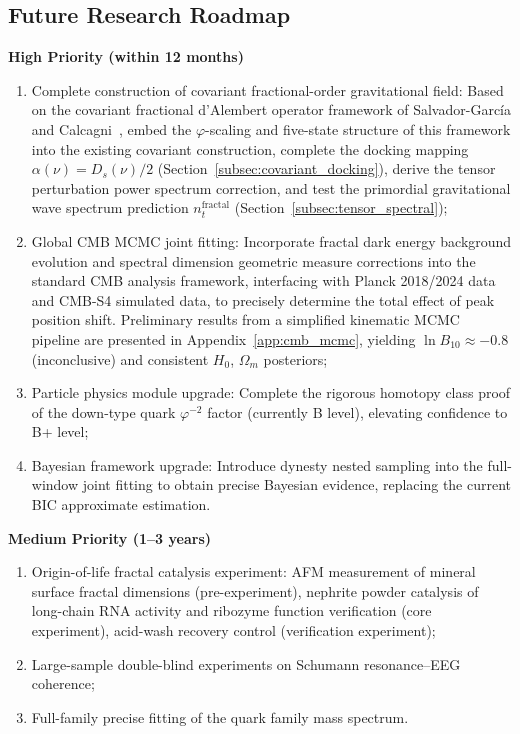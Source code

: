 \documentclass[12pt,a4paper,twocolumn]{article}
\renewcommand{\phi}{\varphi}
\begin{document}
\subsection{Future Research Roadmap}
\textbf{High Priority (within 12 months)}
\begin{enumerate}
\item Complete construction of covariant fractional-order gravitational field: Based on the covariant fractional d'Alembert operator framework of Salvador-Garc\'ia and Calcagni~\cite{SalvadorGarcia2026}, embed the $\phi$-scaling and five-state structure of this framework into the existing covariant construction, complete the docking mapping $\alpha(\nu) = D_s(\nu)/2$ (Section~\ref{subsec:covariant_docking}), derive the tensor perturbation power spectrum correction, and test the primordial gravitational wave spectrum prediction $n_t^{\text{fractal}}$ (Section~\ref{subsec:tensor_spectral});
\item Global CMB MCMC joint fitting: Incorporate fractal dark energy background evolution and spectral dimension geometric measure corrections into the standard CMB analysis framework, interfacing with Planck 2018/2024 data and CMB-S4 simulated data, to precisely determine the total effect of peak position shift. Preliminary results from a simplified kinematic MCMC pipeline are presented in Appendix~\ref{app:cmb_mcmc}, yielding $\ln B_{10} \approx -0.8$ (inconclusive) and consistent $H_0$, $\Omega_m$ posteriors;
\item Particle physics module upgrade: Complete the rigorous homotopy class proof of the down-type quark $\phi^{-2}$ factor (currently B level), elevating confidence to B+ level;
\item Bayesian framework upgrade: Introduce dynesty nested sampling into the full-window joint fitting to obtain precise Bayesian evidence, replacing the current BIC approximate estimation.
\end{enumerate}

\textbf{Medium Priority (1--3 years)}
\begin{enumerate}
\item Origin-of-life fractal catalysis experiment: AFM measurement of mineral surface fractal dimensions (pre-experiment), nephrite powder catalysis of long-chain RNA activity and ribozyme function verification (core experiment), acid-wash recovery control (verification experiment);
\item Large-sample double-blind experiments on Schumann resonance--EEG coherence;
\item Full-family precise fitting of the quark family mass spectrum.
\end{enumerate}
\end{document}
